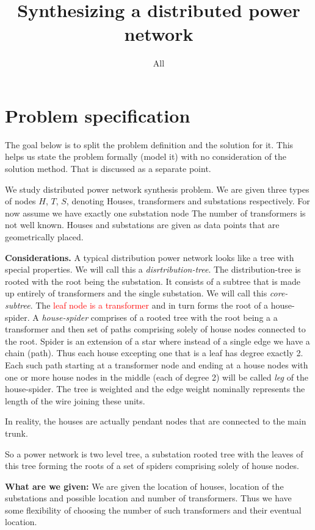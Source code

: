 \documentclass[11pt,letterpaper]{article}
\title{Synthesizing a distributed power network}
\author{All}
\date{}
\begin{document}
\maketitle
\section{Problem specification}
The goal below is to split the problem definition and the solution for it. This helps us state the problem formally (model it) with no consideration of the solution method. That is discussed as a separate point.


We study distributed power network synthesis problem.
We are given three types of nodes $H$, $T$, $S$, denoting Houses, transformers and substations respectively. For now assume
we have exactly one substation node
The number of transformers is not well known. Houses and substations are given as data points that are geometrically placed.

\noindent
\textbf{Considerations.} A typical distribution power network looks like a tree with special properties.  We will call this a \emph{disrtribution-tree}. The distribution-tree is rooted with the root being the substation. 
It consists of a subtree that is made up entirely of transformers and the single substation.  We will call this \emph{core-subtree}. 
The \textcolor{red}{leaf node is a transformer} and in turn
forms the root of a house-spider. A \emph{house-spider} comprises of a rooted tree with the root being a a transformer and then set of paths comprising solely of house nodes connected to the root. Spider is an extension of a star where instead of a single edge we have a chain (path). Thus each house excepting one that is a leaf has degree exactly 2. Each such path starting at a transformer node and ending at a house nodes with one or more house nodes in the middle (each of degree 2) will be called \emph{leg} of the house-spider. The tree is weighted and the edge weight
nominally represents the length of the wire joining these units. 

In reality, the houses are actually pendant nodes that are connected to the main trunk.

So a power network is two level tree, a substation rooted tree with the leaves of this tree forming the roots of a set of spiders comprising solely of house nodes.

\noindent
\textbf{What are we given:} We are given the location of houses, location of the substations and possible location and number of transformers.
Thus we have some flexibility of choosing the number of such transformers and their eventual location. 
\end{document}
